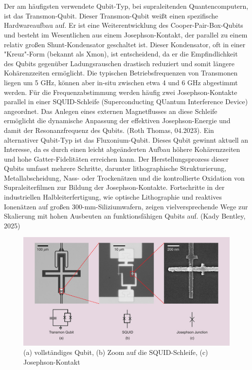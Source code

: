 \\\\
Der am häufigsten verwendete Qubit-Typ, bei supraleitenden Quantencomputern, ist das Transmon-Qubit. Dieser Transmon-Qubit weißt einen spezifische Hardwareaufbau auf. Er ist eine Weiterentwicklung des Cooper-Pair-Box-Qubits und besteht im Wesentlichen aus einem Josephson-Kontakt, der parallel zu einem relativ großen Shunt-Kondensator geschaltet ist. Dieser Kondensator, oft in einer "Kreuz"-Form (bekannt als Xmon), ist entscheidend, da er die Empfindlichkeit des Qubits gegenüber Ladungsrauschen drastisch reduziert und somit längere Kohärenzzeiten ermöglicht. Die typischen Betriebsfrequenzen von Transmonen liegen um 5 GHz, können aber in-situ zwischen etwa 4 und 6 GHz abgestimmt werden. Für die Frequenzabstimmung werden häufig zwei Josephson-Kontakte parallel in einer SQUID-Schleife (Superconducting QUantum Interference Device) angeordnet. Das Anlegen eines externen Magnetflusses an diese Schleife ermöglicht die dynamische Anpassung der effektiven Josephson-Energie und damit der Resonanzfrequenz des Qubits. (Roth Thomas, 04.2023). Ein alternativer Qubit-Typ ist das Fluxonium-Qubit. Dieses Qubit gewinnt aktuell an Interesse, da es durch einen leicht abgeänderten Aufbau höhere Kohärenzzeiten und hohe Gatter-Fidelitäten erreichen kann. Der Herstellungsprozess dieser Qubits umfasst mehrere Schritte, darunter lithographische Strukturierung, Metallabscheidung, Nass- oder Trockenätzen und die kontrollierte Oxidation von Supraleiterfilmen zur Bildung der Josephson-Kontakte. Fortschritte in der industriellen Halbleiterfertigung, wie optische Lithographie und reaktives Ionenätzen auf großen 300-mm-Siliziumwafern, zeigen vielversprechende Wege zur Skalierung mit hohen Ausbeuten an funktionsfähigen Qubits auf. (Kady Bentley, 2025)

\begin{figure}[ht]
    \centering
    \includegraphics[width=1\textwidth]{images/quanten-hardware/Transmon Qubit.jpg}
    \caption{(a) vollständiges Qubit, (b) Zoom auf die SQUID-Schleife, (c) Josephson-Kontakt}
    \label{fig:transom_image}
    \end{figure}

